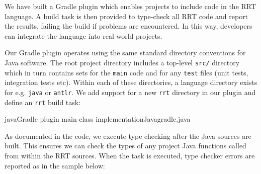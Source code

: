 \documentclass[a4paper,openany,12pt]{book}
\begin{document}
We have built a Gradle plugin which enables projects to include code in the RRT language.
A build task is then provided to type-check all RRT code and report the results, failing the build if problems are
encountered.
In this way, developers can integrate the language into real-world projects.

Our Gradle plugin operates using the same standard directory conventions for Java software.
The root project directory includes a top-level \texttt{src/} directory which in turn contains sets for the
\texttt{main} code and for any \texttt{test} files (unit tests, integration tests etc).
\pagebreak[5]
Within each of these directories, a language directory exists for e.g. \texttt{java} or \texttt{antlr}.
We add support for a new \texttt{rrt} directory in our plugin and define an \texttt{rrt} build task:

\begin{mycodefile}{java}{Gradle plugin main class implementation}{Java}{gradle.java}\end{mycodefile}

As documented in the code, we execute type checking after the Java sources are built.
This ensures we can check the types of any project Java functions called from within the RRT sources.
When the task is executed, type checker errors are reported as in the sample below:

\end{document}
